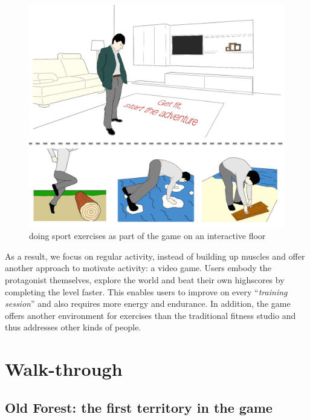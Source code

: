 \documentclass{sigchi}
\begin{document}
  \begin{figure}[!t]
    \centering
    \includegraphics[width=\columnwidth]{roto_main_2}
    \caption{doing sport exercises as part of the game on an interactive floor}
    \label{fig:figure1}
  \end{figure}

    As a result, we focus on regular activity, instead of building up muscles and offer another approach to motivate activity: a video game. Users embody the protagonist themselves, explore the world and beat their own highscores by completing the level faster. This enables users to improve on every ``\emph{training session}'' and also requires more energy and endurance. In addition, the game offers another environment for exercises than the traditional fitness studio and thus addresses other kinds of people.


\section{Walk-through}

  \subsection{Old Forest: the first territory in the game} %
  
\end{document}
